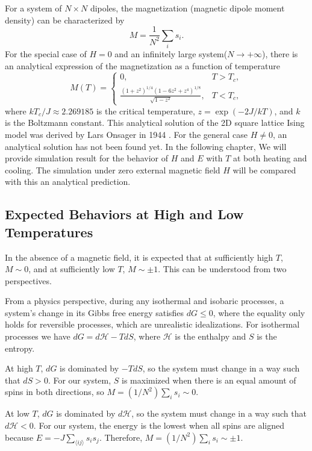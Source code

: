 \documentclass[11pt]{article}
\begin{document}
For a system of $N \times N$ dipoles, the magnetization (magnetic dipole moment density) can be characterized by
\begin{equation}\label{magnetization}
    M = \frac{1}{N^2}\sum_{i} s_i.
\end{equation}
For the special case of $H = 0$ and an infinitely large system($N \rightarrow +\infty$), there is an analytical expression of the magnetization as a function of temperature
\begin{equation}\label{theoryM}
    M(T) = \begin{cases}
            0, & T > T_c, \\
            \frac{(1 + z^2)^{1/4} (1 - 6z^2 + z^4)^{1/8}}{\sqrt{1-z^2}}, & T < T_c,
    \end{cases}
\end{equation}
where $kT_c / J \approx 2.269185$ is the critical temperature, $z = \exp(-2J/kT)$, and $k$ is the Boltzmann constant. This analytical solution of the 2D square lattice Ising model was derived by Lars Onsager in 1944 \cite{onsager1944crystal}. For the general case $H \neq 0$, an analytical solution has not been found yet. In the following chapter, We will provide simulation result for the behavior of $H$ and $E$ with $T$ at both heating and cooling. The simulation under zero external magnetic field $H$ will be compared with this an analytical prediction.

\subsection{Expected Behaviors at High and Low Temperatures}
In the absence of a magnetic field, it is expected that at sufficiently high $T$, $M \sim 0$, and at sufficiently low $T$, $M \sim \pm 1$. This can be understood from two perspectives.

From a physics perspective, during any isothermal and isobaric processes, a system's change in its Gibbs free energy satisfies $dG \leq 0$, where the equality only holds for reversible processes, which are unrealistic idealizations. For isothermal processes we have $dG = d\mathcal{H} - TdS$, where $\mathcal{H}$ is the enthalpy and $S$ is the entropy.

At high $T$, $dG$ is dominated by $-TdS$, so the system must change in a way such that $dS > 0$. For our system, $S$ is maximized when there is an equal amount of spins in both directions, so $M = (1/N^2) \sum_i s_i \sim 0$.

At low $T$, $dG$ is dominated by $d\mathcal{H}$, so the system must change in a way such that $d\mathcal{H} < 0$. For our system, the energy is the lowest when all spins are aligned because $E = -J \sum_{\langle ij \rangle} s_i s_j$. Therefore, $M = (1/N^2) \sum_i s_i \sim \pm 1$.
\end{document}
